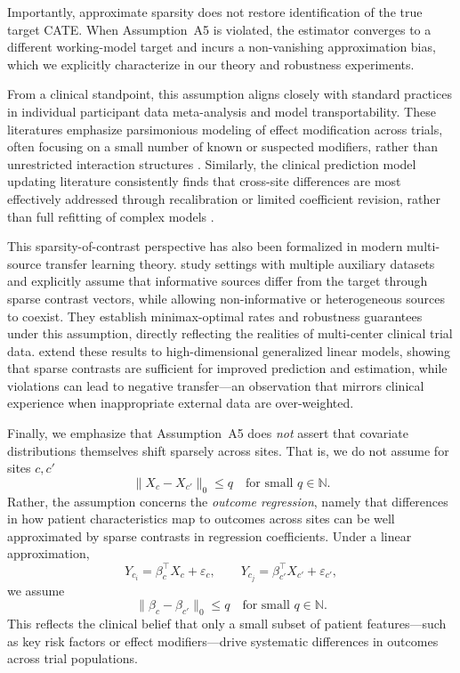 {Importantly, approximate sparsity does not restore identification of the true target CATE.
When Assumption~A5 is violated, the estimator converges to a different working-model target and incurs a non-vanishing approximation bias, which we explicitly characterize in our theory and robustness experiments.

From a clinical standpoint, this assumption aligns closely with standard practices in individual participant data meta-analysis and model transportability. These literatures emphasize parsimonious modeling of effect modification across trials, often focusing on a small number of known or suspected modifiers, rather than unrestricted interaction structures \citep{riley2021using,dahabreh2023efficient}.
Similarly, the clinical prediction model updating literature consistently finds that cross-site differences are most effectively addressed through recalibration or limited coefficient revision, rather than full refitting of complex models \citep{wynants2017key, van2019calibration, steyerberg2019validation}.

This sparsity-of-contrast perspective has also been formalized in modern multi-source transfer learning theory. \cite{li2022transfer} study settings with multiple auxiliary datasets and explicitly assume that informative sources differ from the target through sparse contrast vectors, while allowing non-informative or heterogeneous sources to coexist. 
They establish minimax-optimal rates and robustness guarantees under this assumption, directly reflecting the realities of multi-center clinical trial data.
\cite{tian2023transfer} extend these results to high-dimensional generalized linear models, showing that sparse contrasts are sufficient for improved prediction and estimation, while violations can lead to negative transfer—an observation that mirrors clinical experience when inappropriate external data are over-weighted.

Finally, we emphasize that Assumption~A5 does \emph{not} assert that covariate distributions themselves shift sparsely across sites. That is, we do not assume for sites $c,c'$
\[
\|X_{c} - X_{c'}\|_0 \le q \quad \text{for small } q \in \mathbb{N}.
\]
Rather, the assumption concerns the \emph{outcome regression}, namely that differences in how patient characteristics map to outcomes across sites can be well approximated by sparse contrasts in regression coefficients. Under a linear approximation,
\[
Y_{c_i} = \beta_{c}^\top X_{c} + \varepsilon_{c}, \qquad
Y_{c_j} = \beta_{c'}^\top X_{c'} + \varepsilon_{c'},
\]
we assume
\[
\|\beta_{c} - \beta_{c'}\|_0 \le q \quad \text{for small } q \in \mathbb{N}.
\]
This reflects the clinical belief that only a small subset of patient features—such as key risk factors or effect modifiers—drive systematic differences in outcomes across trial populations.

}
